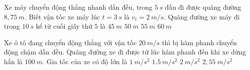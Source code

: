 \begin{ex}%
Xe máy chuyển động thẳng nhanh dần đều, trong $5\ s$ đầu đi được quãng đường $8,75\ m$. Biết vận tốc xe máy lúc $t = 3\ s$ là $v_t = 2\ m/s$. Quãng đường xe máy đi trong $10\ s$ kể từ cuối giây thứ $5$ là
\choice
{$45\ m$}
{$50\ m$}
{\True $55\ m$}
{$60\ m$}
 \end{ex}
\begin{ex}%
Xe ô tô đang chuyển động thẳng với vận tốc $20 \ m/s$ thì bị hãm phanh chuyển động chậm dần đều. Quãng đường xe đi được từ lúc hãm phanh đến khi xe dừng hẳn là $100\ m$. Gia tốc của xe có độ lớn là
\choice
{$1 \ m/s^2$}
{$1.5 \ m/s^2$}
{\True $2 \ m/s^2$}
{$2,55 \ m/s^2$}
\loigiai{}
\end{ex}
